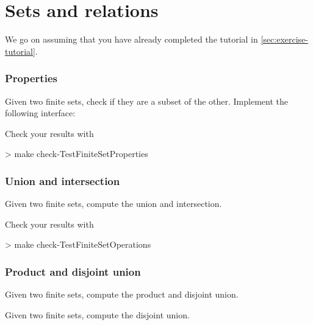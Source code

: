 \chapter{Sets and relations}

We go on assuming that you have already completed the tutorial in \cref{sec:exercise-tutorial}.

\subsection{Properties}

\begin{exercise}
Given two finite sets, check if they are a subset of the other.
Implement the following interface:
\end{exercise}

Check your results with
\begin{console}
> make check-TestFiniteSetProperties
\end{console}

\subsection{Union and intersection}


\begin{exercise}
Given two finite sets, compute the union and intersection.
\end{exercise}


Check your results with
\begin{console}
> make check-TestFiniteSetOperations
\end{console}




\subsection{Product and disjoint union}

\begin{exercise}
Given two finite sets, compute the product and disjoint union.

\end{exercise}
\begin{exercise}
Given two finite sets, compute the disjoint union.

\end{exercise}


